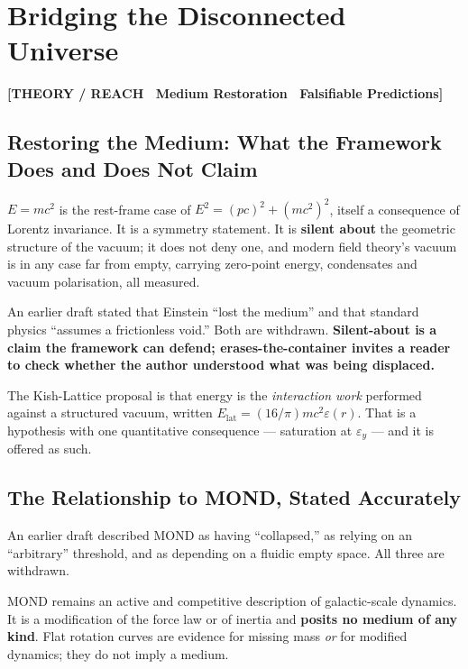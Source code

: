 \documentclass[11pt, letterpaper, openany]{book}
\begin{document}
\chapter{Bridging the Disconnected Universe}

\begin{center}
{\color{theorytag}\textbf{[THEORY / REACH \textbullet\ Medium Restoration \textbullet\ Falsifiable Predictions]}}
\end{center}

\section{Restoring the Medium: What the Framework Does and Does Not Claim}

$E=mc^2$ is the rest-frame case of $E^2 = (pc)^2 + (mc^2)^2$, itself a consequence of Lorentz
invariance. It is a symmetry statement. It is \textbf{silent about} the geometric structure of the
vacuum; it does not deny one, and modern field theory's vacuum is in any case far from empty,
carrying zero-point energy, condensates and vacuum polarisation, all measured.

\begin{correctionbox}
An earlier draft stated that Einstein ``lost the medium'' and that standard physics ``assumes a
frictionless void.'' Both are withdrawn. \textbf{Silent-about is a claim the framework can defend;
erases-the-container invites a reader to check whether the author understood what was being
displaced.}
\end{correctionbox}

The Kish-Lattice proposal is that energy is the \emph{interaction work} performed against a
structured vacuum, written $E_{\mathrm{lat}} = (16/\pi)mc^2\varepsilon(r)$. That is a hypothesis
with one quantitative consequence --- saturation at $\varepsilon_y$ --- and it is offered as such.

\section{The Relationship to MOND, Stated Accurately}

\begin{correctionbox}
An earlier draft described MOND as having ``collapsed,'' as relying on an ``arbitrary'' threshold,
and as depending on a fluidic empty space. All three are withdrawn.

\medskip
MOND remains an active and competitive description of galactic-scale dynamics. It is a modification
of the force law or of inertia and \textbf{posits no medium of any kind}. Flat rotation curves are
evidence for missing mass \emph{or} for modified dynamics; they do not imply a medium.
\end{correctionbox}
\end{document}
